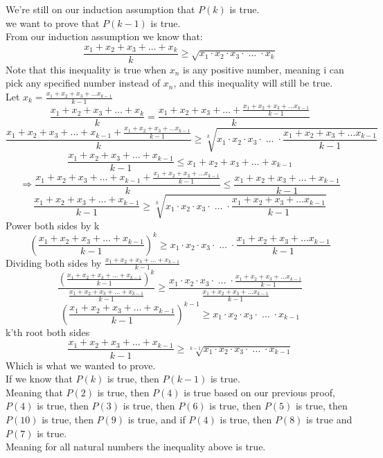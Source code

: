 We're still on our induction assumption that $P(k)$ is true.\\
we want to prove that $P(k-1)$ is true.\\
From our induction assumption we know that:
\[
    \frac{x_1+x_2+x_3+\ldots+x_k}{k}\geq \sqrt{x_1\cdot x_2\cdot x_3\cdot \; \ldots\; \cdot x_k}
\]
Note that this inequality is true when $x_n$ is any positive number, meaning i can pick any specified number instead of $x_n$, and this inequality will still be true.\\
Let $x_k = \frac{x_1+x_2+x_3+\ldots x_{k-1}}{k-1}$
\[
    \frac{x_1+x_2+x_3+\ldots+x_k}{k} = \frac{x_1+x_2+x_3+\ldots+\frac{x_1+x_2+x_3+\ldots x_{k-1}}{k-1}}{k}
\]
\[
    \frac{x_1+x_2+x_3+\ldots+x_{k-1}+\frac{x_1+x_2+x_3+\ldots x_{k-1}}{k-1}}{k} \geq \sqrt[k]{x_1\cdot x_2\cdot x_3\cdot \;\ldots\; \cdot \frac{x_1+x_2+x_3+\ldots x_{k-1}}{k-1}}
\]
\[
    \frac{x_1+x_2+x_3+\ldots+x_{k-1}}{k-1} \leq x_1+x_2+x_3+\ldots+x_{k-1} 
\]
\[
    \Longrightarrow \frac{x_1+x_2+x_3+\ldots+x_{k-1}+\frac{x_1+x_2+x_3+\ldots x_{k-1}}{k-1}}{k} \leq \frac{x_1+x_2+x_3+\ldots+x_{k-1}}{k-1}
\]
\[
    \frac{x_1+x_2+x_3+\ldots+x_{k-1}}{k-1} \geq \sqrt[k]{x_1\cdot x_2\cdot x_3\cdot \;\ldots\; \cdot \frac{x_1+x_2+x_3+\ldots x_{k-1}}{k-1}}
\]
Power both sides by k
\[
    {(\frac{x_1+x_2+x_3+\ldots+x_{k-1}}{k-1})}^k \geq x_1\cdot x_2\cdot x_3\cdot \;\ldots\; \cdot \frac{x_1+x_2+x_3+\ldots x_{k-1}}{k-1}
\]
Dividing both sides by $\frac{x_1+x_2+x_3+\ldots+x_{k-1}}{k-1}$
\[
    \frac{{(\frac{x_1+x_2+x_3+\ldots+x_{k-1}}{k-1})}^k}{\frac{x_1+x_2+x_3+\ldots+x_{k-1}}{k-1}} \geq \frac{x_1\cdot x_2\cdot x_3\cdot \;\ldots\; \cdot \frac{x_1+x_2+x_3+\ldots x_{k-1}}{k-1}}{\frac{x_1+x_2+x_3+\ldots x_{k-1}}{k-1}}
\]
\[
    {(\frac{x_1+x_2+x_3+\ldots+x_{k-1}}{k-1})}^{k-1} \geq x_1\cdot x_2\cdot x_3\cdot \;\ldots\; \cdot x_{k-1}
\]
k'th root both sides
\[
    \frac{x_1+x_2+x_3+\ldots+x_{k-1}}{k-1} \geq \sqrt[k-1]{x_1\cdot x_2\cdot x_3\cdot \;\ldots\; \cdot x_{k-1}}
\]
Which is what we wanted to prove.\\
If we know that $P(k)$ is true, then $P(k-1)$ is true.\\
Meaning that $P(2)$ is true, then $P(4)$ is true based on our previous proof,$P(4)$ is true, then $P(3)$ is true, then $P(6)$ is true, then $P(5)$ is true, then $P(10)$ is true, then $P(9)$ is true, and if $P(4)$ is true, then $P(8)$ is true and $P(7)$ is true.\\
Meaning for all natural numbers the inequality above is true.\\
